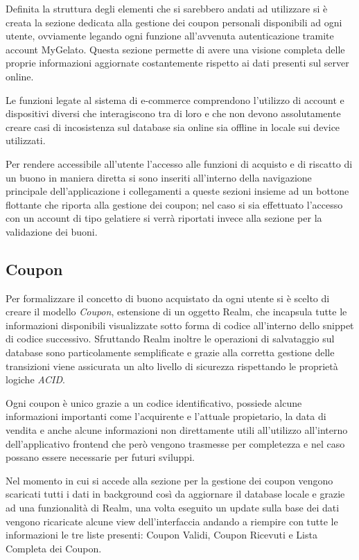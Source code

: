 Definita la struttura degli elementi che si sarebbero andati ad utilizzare
si è creata la sezione dedicata alla gestione dei coupon personali
disponibili ad ogni utente, ovviamente legando ogni funzione all'avvenuta
autenticazione tramite account MyGelato. Questa sezione permette di
avere una visione completa delle proprie informazioni aggiornate costantemente
rispetto ai dati presenti sul server online.

Le funzioni legate al sistema di e-commerce comprendono l'utilizzo
di account e dispositivi diversi che interagiscono tra di loro e che
non devono assolutamente creare casi di incosistenza sul database
sia online sia offline in locale sui device utilizzati.

Per rendere accessibile all'utente l'accesso alle funzioni di acquisto
e di riscatto di un buono in maniera diretta si sono inseriti all'interno
della navigazione principale dell'applicazione i collegamenti a queste
sezioni insieme ad un bottone flottante che riporta alla gestione
dei coupon; nel caso si sia effettuato l'accesso con un account di
tipo gelatiere si verrà riportati invece alla sezione per la validazione
dei buoni.

\subsection{Coupon}

Per formalizzare il concetto di buono acquistato da ogni utente si
è scelto di creare il modello \emph{Coupon}, estensione di un oggetto
Realm, che incapsula tutte le informazioni disponibili visualizzate
sotto forma di codice all'interno dello snippet di codice successivo.
Sfruttando Realm inoltre le operazioni di salvataggio sul database
sono particolamente semplificate e grazie alla corretta gestione delle
transizioni viene assicurata un alto livello di sicurezza rispettando
le proprietà logiche \emph{ACID}.

Ogni coupon è unico grazie a un codice identificativo, possiede alcune
informazioni importanti come l'acquirente e l'attuale propietario,
la data di vendita e anche alcune informazioni non direttamente utili
all'utilizzo all'interno dell'applicativo frontend che però vengono
trasmesse per completezza e nel caso possano essere necessarie per
futuri sviluppi. 

Nel momento in cui si accede alla sezione per la gestione dei coupon
vengono scaricati tutti i dati in background così da aggiornare il
database locale e grazie ad una funzionalità di Realm, una volta eseguito
un update sulla base dei dati vengono ricaricate alcune view dell'interfaccia
andando a riempire con tutte le informazioni le tre liste presenti:
Coupon Validi, Coupon Ricevuti e Lista Completa dei Coupon.

